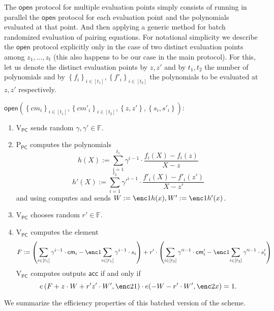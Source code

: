 \documentclass[11pt]{article} %
\newcommand{\F}{\ensuremath{\mathbb F}\xspace}
\newcommand{\cm}{\ensuremath{\mathsf{cm}}\xspace}
\newcommand{\open}{\ensuremath{\mathsf{open}}\xspace}
\newcommand{\acc}{\ensuremath{\mathsf{acc}}\xspace}
\newcommand{\defeq}{:=}
\newcommand{\sett}[2]{\ensuremath{\set{#1}_{#2}}\xspace}
\newcommand{\prvpc}{\ensuremath{\mathrm{P_{\mathsf{PC}}}}\xspace}
\newcommand{\verpc}{\ensuremath{\mathrm{V_{\mathsf{PC}}}}\xspace}
\newcommand{\set}[1]{\ensuremath{\left\{#1\right\}}\xspace}
\begin{document}
\begin{enumerate}
 
 
 
 
 
 The \open protocol for multiple evaluation points simply consists of running in parallel the \open protocol for each evaluation point and the polynomials evaluated at that point.
 And then applying a generic method for batch randomized evaluation of pairing equations.
 For notational simplicity we describe the \open protocol explicitly only in the case of two distinct evaluation points among $z_1,\ldots,z_t$ (this also happens to be our case in the main protocol).
For this, let us denote the distinct evaluation points by $z,z'$ and by $t_1,t_2$ the number of polynomials and by $\sett
{f_i}{i\in [t_1]},\sett{f'_i}{i\in [t_2]}$ the polynomials to be evaluated at $z,z'$ respectively.


 \underline{$\open(\sett{cm_i}{i\in [t_1]},\sett{cm'_i}{i\in [t_2]},\set{z,z'},\set{s_i,s'_i})$}:
 \begin{enumerate}
  \item \verpc sends random $\gamma,\gamma' \in \F$.
 \item\label{step:computeW}  \prvpc computes the polynomials
 \[h(X)\defeq \sum_{i=1}^{t_1} \gamma^{i-1}\cdot \frac{f_i(X)-f_i(z)}{X-z}  \]
 \[h'(X)\defeq \sum_{i=1}^{t_2} \gamma'^{i-1}\cdot \frac{f'_i(X)-f'_i(z')}{X-z'}  \]
 and using  computes and sends $W\defeq \enc1{h(x)}, W'\defeq \enc1{h'(x)}$.
 \item \verpc chooses random $r'\in \F$.
 \item\verpc computes the element 
 \[F\defeq \left(\sum_{i\in [t_1]} \gamma^{i-1} \cdot \cm_i-\enc1{\sum_{i\in [t_1]} \gamma^{i-1}\cdot s_i}\right) +  r' \cdot\left(\sum_{i\in [t_2]} \gamma'^{i-1} \cdot \cm'_i -\enc1{\sum_{i\in [t_2]} \gamma'^{i-1}\cdot s'_i}\right)\]
 \verpc computes outputs \acc if and only if
 \[ e\left(F + z\cdot W +r'z'\cdot W',\enc2{1}\right )\cdot e(-W-r'\cdot W',\enc2{x} )=1. \]
 
 \end{enumerate}

 
 
 We summarize the efficiency properties of this batched version of the \cite{kate} scheme.
 

\end{enumerate}
\end{document}
